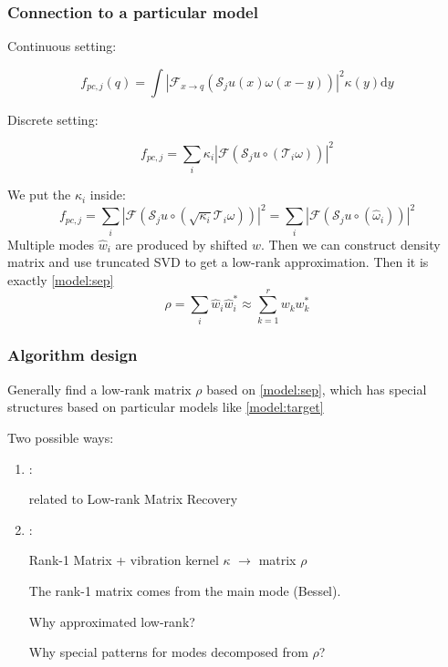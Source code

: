 \documentclass[UTF8]{beamer}
\begin{document}
\begin{frame} \frametitle{Connection to a particular model}

Continuous setting:

\begin{equation}
f_{p c, j}(q) = \int\left|\mathcal{F}_{x \rightarrow q}\left(\mathcal{S}_{j} u(x) \omega(x-y)\right)\right|^{2} \kappa(y) \mathrm{d} y
\end{equation}

Discrete setting:

\begin{equation}
f_{p c, j}=\sum_{i} \kappa_{i}\left|\mathcal{F}\left( \mathcal{S}_{j} u \circ \left(\mathcal{T}_{i} \omega\right) \right)\right|^{2}
\label{model:target}
\end{equation}

 We put the $\kappa_{i}$ inside:
\begin{equation}
f_{p c, j}=\sum_{i} \left|\mathcal{F}\left( \mathcal{S}_{j} u \circ \left( \sqrt{\kappa_{i}}\mathcal{T}_{i} \omega\right) \right)\right|^{2}
=
\sum_{i} \left|\mathcal{F}\left( \mathcal{S}_{j} u \circ \left( \hat{\omega}_i\right) \right)\right|^{2}
\end{equation}
Multiple modes $\hat{w}_i$ are produced by shifted $w$. Then we can construct density matrix and use truncated SVD to get a low-rank approximation. Then it is exactly \eqref{model:sep}
$$
\rho = \sum_i \hat{w}_i \hat{w}_i^* \approx \sum_{k=1}^{r} w_k w_k^* 
$$

\end{frame}




\begin{frame} \frametitle{Algorithm design}

Generally find a low-rank matrix $\rho$ based on \eqref{model:sep}, which has
special structures based on particular models like \eqref{model:target}

Two possible ways:

\begin{enumerate}

\item {}:  

related to Low-rank Matrix Recovery

\item {}:

Rank-1 Matrix + vibration kernel $\kappa$ $\rightarrow$ matrix $\rho$

The rank-1 matrix comes from the main mode (Bessel).

Why approximated low-rank?

Why special patterns for modes decomposed from $\rho$? 
\end{enumerate}





\end{frame}
\end{document}
